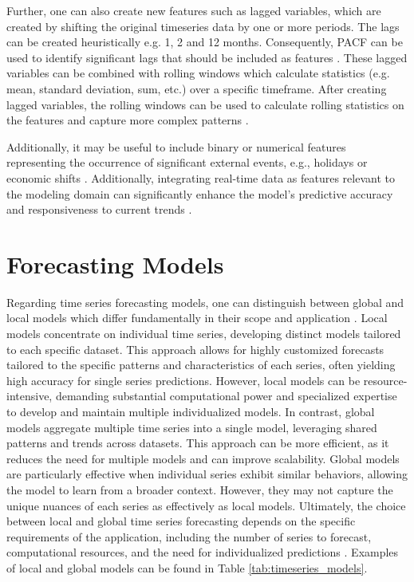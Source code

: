 Further, one can also create new features such as lagged variables, which are created
by shifting the original timeseries data by one or more periods. The lags can be created
heuristically e.g. 1, 2 and 12 months. Consequently, \ac{PACF} can be used to identify
significant lags that should be included as features \parencite[ch. 6]{hyndman2018forecasting}.
These lagged variables can be combined with rolling windows which calculate statistics
(e.g. mean, standard deviation, sum, etc.) over a specific timeframe. After creating
lagged variables, the rolling windows can be used to calculate rolling statistics on
the features and capture more complex patterns \parencite[ch. 6]{hyndman2018forecasting}.

Additionally, it may be useful to include binary or numerical features representing
the occurrence of significant external events, e.g., holidays or economic shifts
\parencite[ch. 3]{hyndman2018forecasting}. Additionally, integrating real-time data as
features relevant to the modeling domain can significantly enhance the model's predictive
accuracy and responsiveness to current trends \parencite{2d9a26d795dd48a5a890e34035ac1882}.

\section{Forecasting Models}
\label{sec:forecasting_models}
Regarding time series forecasting models, one can distinguish between global and local
models which differ fundamentally in their scope and application \parencite{montero2021principles}.
Local models concentrate on individual time series, developing distinct models
tailored to each specific dataset. This
approach allows for highly customized forecasts tailored to the specific patterns and
characteristics of each series, often yielding high accuracy for single series predictions.
However, local models can be resource-intensive, demanding substantial computational power and
specialized expertise to develop and maintain multiple individualized models. In contrast,
global models aggregate
multiple time series into a single model, leveraging shared patterns and trends across datasets.
This approach can be more efficient, as it reduces the need for multiple models and can
improve scalability. Global models are particularly effective when individual series
exhibit similar behaviors, allowing the model to learn from a broader context. However,
they may not capture the unique nuances of each series as effectively as local models.
Ultimately, the choice between local and global time series forecasting depends on the
specific requirements of the application, including the number of series to forecast,
computational resources, and the need for individualized predictions
\parencite{montero2021principles}. Examples of local and global models can be found in
Table \ref{tab:timeseries_models}.

